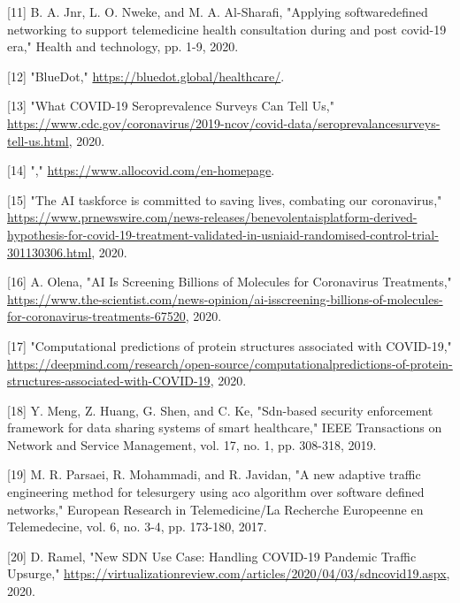 \documentclass[10pt]{article}
\begin{document}
[11] B. A. Jnr, L. O. Nweke, and M. A. Al-Sharafi, "Applying softwaredefined networking to support telemedicine health consultation during and post covid-19 era," Health and technology, pp. 1-9, 2020.

[12] "BlueDot," \href{https://bluedot.global/healthcare/}{https://bluedot.global/healthcare/}.

[13] "What COVID-19 Seroprevalence Surveys Can Tell Us," \href{https://www.cdc.gov/coronavirus/2019-ncov/covid-data/seroprevalancesurveys-tell-us.html}{https://www.cdc.gov/coronavirus/2019-ncov/covid-data/seroprevalancesurveys-tell-us.html}, 2020.

[14] "," \href{https://www.allocovid.com/en-homepage}{https://www.allocovid.com/en-homepage}.

[15] "The AI taskforce is committed to saving lives, combating our coronavirus," \href{https://www.prnewswire.com/news-releases/benevolentaisplatform-derived-hypothesis-for-covid-19-treatment-validated-in-usniaid-randomised-control-trial-301130306.html}{https://www.prnewswire.com/news-releases/benevolentaisplatform-derived-hypothesis-for-covid-19-treatment-validated-in-usniaid-randomised-control-trial-301130306.html}, 2020.

[16] A. Olena, "AI Is Screening Billions of Molecules for Coronavirus Treatments," \href{https://www.the-scientist.com/news-opinion/ai-isscreening-billions-of-molecules-for-coronavirus-treatments-67520}{https://www.the-scientist.com/news-opinion/ai-isscreening-billions-of-molecules-for-coronavirus-treatments-67520}, 2020.

[17] "Computational predictions of protein structures associated with COVID-19," \href{https://deepmind.com/research/open-source/computationalpredictions-of-protein-structures-associated-with-COVID-19}{https://deepmind.com/research/open-source/computationalpredictions-of-protein-structures-associated-with-COVID-19}, 2020.

[18] Y. Meng, Z. Huang, G. Shen, and C. Ke, "Sdn-based security enforcement framework for data sharing systems of smart healthcare," IEEE Transactions on Network and Service Management, vol. 17, no. 1, pp. 308-318, 2019.

[19] M. R. Parsaei, R. Mohammadi, and R. Javidan, "A new adaptive traffic engineering method for telesurgery using aco algorithm over software defined networks," European Research in Telemedicine/La Recherche Europeenne en Telemedecine, vol. 6, no. 3-4, pp. 173-180, 2017.

[20] D. Ramel, "New SDN Use Case: Handling COVID-19 Pandemic Traffic Upsurge," \href{https://virtualizationreview.com/articles/2020/04/03/sdncovid19.aspx}{https://virtualizationreview.com/articles/2020/04/03/sdncovid19.aspx}, 2020.
\end{document}
